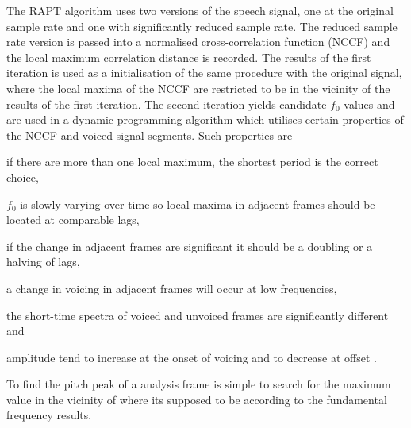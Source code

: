 The RAPT algorithm uses two versions of the speech signal, one at the original sample rate and one with significantly reduced sample rate. The reduced sample rate version is passed into a normalised cross-correlation function (NCCF) and the local maximum correlation distance is recorded. The results of the first iteration is used as a initialisation of the same procedure with the original signal, where the local maxima of the NCCF are restricted to be in the vicinity of the results of the first iteration. The second iteration yields candidate $f_0$ values and are used in a dynamic programming algorithm which utilises certain properties of the NCCF and voiced signal segments. Such properties are \begin{inparaenum} \item if there are more than one local maximum, the shortest period is the correct choice, \item $f_0$ is slowly varying over time so local maxima in adjacent frames should be located at comparable lags, \item if the change in adjacent frames are significant it should be a doubling or a halving of lags, \item a change in voicing in adjacent frames will occur at low frequencies, \item the short-time spectra of voiced and unvoiced frames are significantly different and \item amplitude tend to increase at the onset of voicing and to decrease at offset \cite{talkin95}.\end{inparaenum}

To find the pitch peak of a analysis frame is simple to search for the maximum value in the vicinity of where its supposed to be according to the fundamental frequency results.



